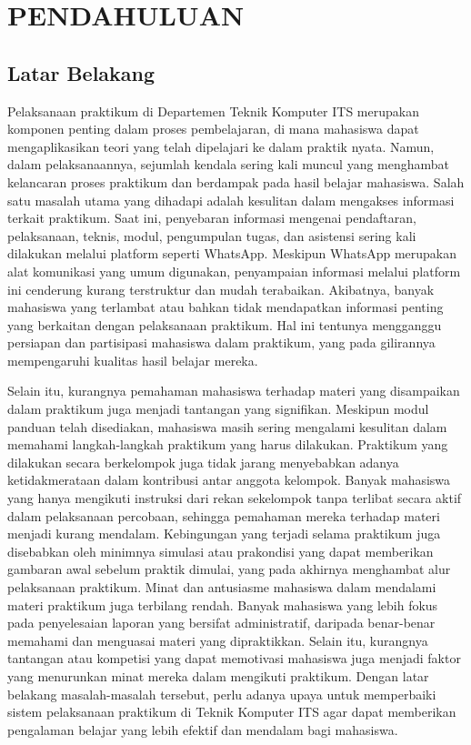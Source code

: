 \chapter{PENDAHULUAN}
\sloppy
\section{Latar Belakang}
Pelaksanaan praktikum di Departemen Teknik Komputer ITS merupakan komponen penting dalam proses pembelajaran, di mana mahasiswa dapat mengaplikasikan teori yang telah dipelajari ke dalam praktik nyata. Namun, dalam pelaksanaannya, sejumlah kendala sering kali muncul yang menghambat kelancaran proses praktikum dan berdampak pada hasil belajar mahasiswa. Salah satu masalah utama yang dihadapi adalah kesulitan dalam mengakses informasi terkait praktikum. Saat ini, penyebaran informasi mengenai pendaftaran, pelaksanaan, teknis, modul, pengumpulan tugas, dan asistensi sering kali dilakukan melalui platform seperti WhatsApp. Meskipun WhatsApp merupakan alat komunikasi yang umum digunakan, penyampaian informasi melalui platform ini cenderung kurang terstruktur dan mudah terabaikan. Akibatnya, banyak mahasiswa yang terlambat atau bahkan tidak mendapatkan informasi penting yang berkaitan dengan pelaksanaan praktikum. Hal ini tentunya mengganggu persiapan dan partisipasi mahasiswa dalam praktikum, yang pada gilirannya mempengaruhi kualitas hasil belajar mereka.

Selain itu, kurangnya pemahaman mahasiswa terhadap materi yang disampaikan dalam praktikum juga menjadi tantangan yang signifikan. Meskipun modul panduan telah disediakan, mahasiswa masih sering mengalami kesulitan dalam memahami langkah-langkah praktikum yang harus dilakukan. Praktikum yang dilakukan secara berkelompok juga tidak jarang menyebabkan adanya ketidakmerataan dalam kontribusi antar anggota kelompok. Banyak mahasiswa yang hanya mengikuti instruksi dari rekan sekelompok tanpa terlibat secara aktif dalam pelaksanaan percobaan, sehingga pemahaman mereka terhadap materi menjadi kurang mendalam. Kebingungan yang terjadi selama praktikum juga disebabkan oleh minimnya simulasi atau prakondisi yang dapat memberikan gambaran awal sebelum praktik dimulai, yang pada akhirnya menghambat alur pelaksanaan praktikum. Minat dan antusiasme mahasiswa dalam mendalami materi praktikum juga terbilang rendah. Banyak mahasiswa yang lebih fokus pada penyelesaian laporan yang bersifat administratif, daripada benar-benar memahami dan menguasai materi yang dipraktikkan. Selain itu, kurangnya tantangan atau kompetisi yang dapat memotivasi mahasiswa juga menjadi faktor yang menurunkan minat mereka dalam mengikuti praktikum. Dengan latar belakang masalah-masalah tersebut, perlu adanya upaya untuk memperbaiki sistem pelaksanaan praktikum di Teknik Komputer ITS agar dapat memberikan pengalaman belajar yang lebih efektif dan mendalam bagi mahasiswa.

